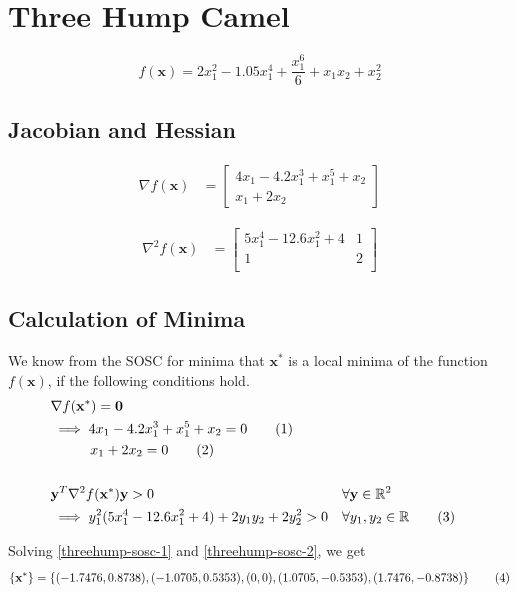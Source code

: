 \documentclass[a4paper]{article}
\newcommand\numberthis{\addtocounter{equation}{1}\tag{\theequation}}
\begin{document}
\section{Three Hump Camel}

$$f(\textbf{x}) = 2 x_1^2 - 1.05 x_1^4 + \frac{x_1^6}{6} + x_1 x_2 + x_2^2$$

\subsection{Jacobian and Hessian}

\begin{align*}
\nabla f(\textbf{x}) &=
    \begin{bmatrix}
        4 x_1 - 4.2 x_1^3 + x_1^5 + x_2 \\
        x_1 + 2 x_2
    \end{bmatrix}
\end{align*}

\begin{align*}
\nabla^2 f(\textbf{x}) &=
    \begin{bmatrix}
        5 x_1^4 - 12.6 x_1^2 + 4 & 1 \\
        1 & 2 \\
    \end{bmatrix}
\end{align*}

\subsection{Calculation of Minima}

We know from the SOSC for minima that $\textbf{x}^*$ is a local minima of the function $f(\textbf{x})$, if the following conditions hold.
\begin{align*}
&\nabla f(\textbf{x}^*) = \textbf{0} \\
&\implies 4 x_1 - 4.2 x_1^3 + x_1^5 + x_2 = 0 \numberthis \label{threehump-sosc-1} \\
&\phantom{\implies} \ \ x_1 + 2 x_2 = 0 \numberthis \label{threehump-sosc-2} \\ \\
&\textbf{y}^T \nabla^2 f(\textbf{x}^*) \textbf{y} > 0 &&\forall \textbf{y} \in \mathbb{R}^2 \\
&\implies y_1^2 (5 x_1^4 - 12.6 x_1^2 + 4) + 2 y_1 y_2 + 2 y_2^2 > 0 &&\forall y_1, y_2 \in \mathbb{R} \numberthis \label{threehump-sosc-3}
\end{align*}

Solving \eqref{threehump-sosc-1} and \eqref{threehump-sosc-2}, we get
\begin{align*}
    \left\{\textbf{x}^*\right\} = \left\{(-1.7476, 0.8738), (-1.0705, 0.5353), (0, 0), (1.0705, -0.5353), (1.7476, -0.8738)\right\} \numberthis \label{threehump-sosc-4}
\end{align*}
\end{document}
